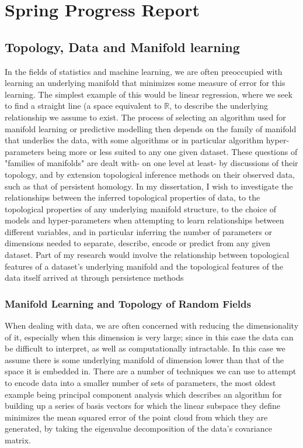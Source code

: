 \documentclass[a4paper,12pt]{report}
\theoremstyle{definition}
\begin{document}
\chapter*{Spring Progress Report}
\section*{Topology, Data and Manifold learning}
In the fields of statistics and machine learning, we are often preoccupied with learning an underlying manifold that minimizes some measure of error for this learning. The simplest example of this would be linear regression, where we seek to find a straight line (a space equivalent to $\mathbb{R}$, to describe the underlying relationship we assume to exist. The process of selecting an algorithm used for manifold learning or predictive modelling then depends on the family of manifold that underlies the data, with some algorithms or in particular algorithm hyper-parameters being more or less suited to any one given dataset. These questions of "families of manifolds" are dealt with- on one level at least- by discussions of their topology, and by extension topological inference methods on their observed data, such as that of persistent homology. In my dissertation, I wish to investigate the relationships between the inferred topological properties of data, to the topological properties of any underlying manifold structure, to the choice of models and hyper-parameters when attempting to learn relationships between different variables, and  in particular inferring the number of parameters or dimensions needed to separate, describe, encode or predict from any given dataset. Part of my research would involve the relationship between topological features of a dataset's underlying manifold and the topological features of the data itself arrived at through persistence methods

 \subsection*{Manifold Learning and Topology of Random Fields}
 When dealing with data, we are often concerned with reducing the dimensionality of it, especially when this dimension is very large; since in this case the data can be difficult to interpret, as well as computationally intractable. In this case we assume there is some underlying manifold of dimension lower than that of the space it is embedded in. There are a number of techniques we can use to attempt to encode data into a smaller number of sets of parameters, the most oldest example being principal component analysis \cite{pca} which describes an algorithm for building up a series of basis vectors for which the linear subspace they define minimizes the mean squared error of the point cloud from which they are generated, by taking the eigenvalue decomposition of the data's covariance matrix.
 
\end{document}
